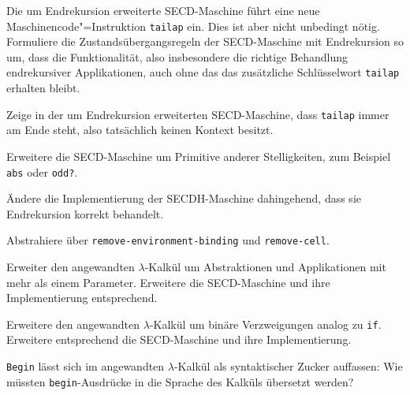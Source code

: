 \begin{aufgabe}
  Die um Endrekursion erweiterte SECD-Maschine führt eine neue
  Maschinencode"=Instruktion \texttt{tailap} ein.  Dies ist aber nicht
  unbedingt nötig.  Formuliere die Zustandsübergangsregeln der
  SECD-Maschine mit Endrekursion so um, dass die Funktionalität, also
  insbesondere die richtige Behandlung endrekursiver Applikationen,
  auch ohne das das zusätzliche Schlüsselwort \texttt{tailap}
  erhalten bleibt.
\end{aufgabe}

\begin{aufgabe}
  Zeige in der um Endrekursion erweiterten
  SECD-Maschine, dass \texttt{tailap} immer am Ende steht, also
  tatsächlich keinen Kontext besitzt.
\end{aufgabe}

\begin{aufgabe}\label{aufgabe:prim-arity}
  Erweitere die SECD-Maschine um Primitive anderer Stelligkeiten,
  zum Beispiel \texttt{abs} oder \texttt{odd?}.
\end{aufgabe}

\begin{aufgabe}
  Ändere die Implementierung der SECDH-Maschine dahingehend, dass
  sie Endrekursion korrekt behandelt.
\end{aufgabe}

\begin{aufgabe}
  Abstrahiere über \texttt{remove-environment-binding} und
  \texttt{remove-cell}.
\end{aufgabe}

\begin{aufgabe}
  Erweiter den angewandten $\lambda$-Kalkül um Abstraktionen und
  Applikationen mit mehr als einem Parameter.  Erweitere die
  SECD-Maschine und ihre Implementierung entsprechend.
\end{aufgabe}


\begin{aufgabe}
  Erweitere den angewandten $\lambda$-Kalkül um binäre
  Verzweigungen analog zu \texttt{if}.  Erweitere entsprechend die
  SECD-Maschine und ihre Implementierung.
\end{aufgabe}

\begin{aufgabe}
  \texttt{Begin} lässt sich im angewandten $\lambda$-Kalkül als
  syntaktischer Zucker auffassen: Wie müssten \texttt{begin}-Ausdrücke
  in die Sprache des Kalküls übersetzt werden?
\end{aufgabe}

